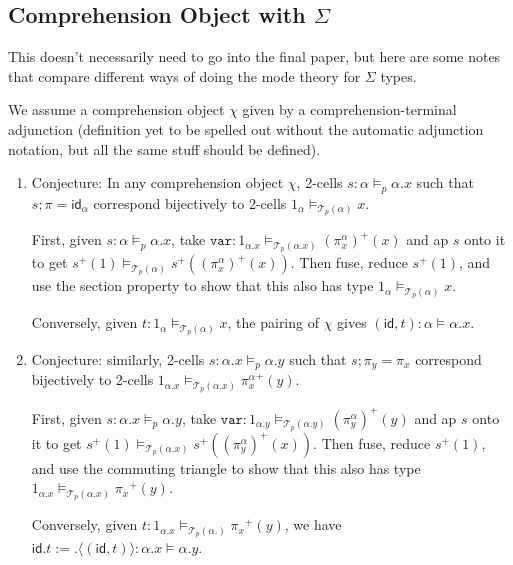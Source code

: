 \documentclass[10pt]{article}
\theoremstyle{definition}
\newcommand{\id}{\mathsf{id}}
\newcommand\TrPlus[2]{\ensuremath{{#1}^+(#2)}}
\newcommand\El[2]{\mathcal{T}_{#1}(#2)}
\newcommand\ap[2]{\ensuremath{#1 \langle #2 \rangle }}
\begin{document}
\subsection{Comprehension Object with $\Sigma$}

This doesn't necessarily need to go into the final paper, but here are
some notes that compare different ways of doing the mode theory for
$\Sigma$ types.

We assume a comprehension object $\chi$ given by a
comprehension-terminal adjunction (definition yet to be spelled out
without the automatic adjunction notation, but all the same stuff should
be defined).

\newcommand\mtt[1]{\mathtt{#1}}

\begin{enumerate}

\item \label{sigma:total-to-fiber0} Conjecture: In any comprehension
  object $\chi$, 2-cells $s : \alpha \vDash_p \alpha.x$ such that $s;\pi
  = \id_\alpha$ correspond bijectively to 2-cells $1_\alpha
  \vDash_{\El{p}{\alpha}} x$.

  First, given $s : \alpha \vDash_p \alpha.x$, take $\mtt{var} : 1_{\alpha.x}
  \vDash_{\El{p}{\alpha.x}} \TrPlus{(\pi^\alpha_x)}{x}$ and ap $s$ onto
  it to get $\TrPlus{s}{1} \vDash_{\El{p}{\alpha}}
  \TrPlus{s}{\TrPlus{(\pi^\alpha_x)}{x}}$.  Then fuse, reduce
  $\TrPlus{s}{1}$, and use the section property to show that this also
  has type
  $1_\alpha \vDash_{\El{p}{\alpha}} x$.

  Conversely, given $t : 1_\alpha \vDash_{\El{p}{\alpha}} x$,
  the pairing of $\chi$ gives $(\id, t) : \alpha \vDash \alpha.x$.

\item \label{sigma:total-to-fiber1} Conjecture: similarly, 2-cells $s :
  \alpha.x \vDash_p \alpha.y$ such that $s;\pi_y = \pi_x$ correspond
  bijectively to 2-cells $1_{\alpha.x} \vDash_{\El{p}{\alpha.x}}
  \TrPlus{\pi^\alpha_x}{y}$.

  First, given $s : \alpha.x \vDash_p \alpha.y$, take $\mtt{var} :
  1_{\alpha.y} \vDash_{\El{p}{\alpha.y}} \TrPlus{(\pi^\alpha_y)}{y}$ and
  ap $s$ onto it to get $\TrPlus{s}{1} \vDash_{\El{p}{\alpha.x}}
  \TrPlus{s}{\TrPlus{(\pi^\alpha_y)}{x}}$.  Then fuse, reduce
  $\TrPlus{s}{1}$, and use the commuting triangle to show that this also
  has type $1_{\alpha.x} \vDash_{\El{p}{\alpha.x}} \TrPlus{\pi_x} y$.

  Conversely, given $t : 1_{\alpha.x} \vDash_{\El{p}{\alpha.}}
  \TrPlus{\pi_x} y$, we have $\id.t := \ap{.}{(\id, t)} : \alpha.x \vDash \alpha.y$.


\end{enumerate}
\end{document}
